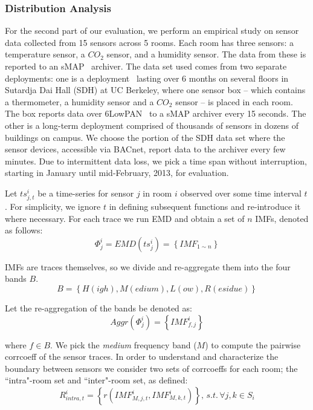 \subsubsection{Distribution Analysis}
For the second part of our evaluation, we perform an empirical study on sensor data collected from 15 sensors across 5 rooms. 
Each room has three sensors: a temperature sensor, a $CO_{2}$ sensor,  and a humidity sensor. 
The data from these is reported to an  
sMAP~\cite{smap} archiver. The data set used comes from two separate deployments: one is a deployment~\cite{Jay} lasting 
over 6 months on several floors in Sutardja Dai Hall (SDH) at UC Berkeley, where one sensor box -- which contains a thermometer, a humidity sensor
 and a $CO_{2}$ sensor -- is placed in each room. The box reports data over 6LowPAN~\cite{6lowpan} to a sMAP archiver every 
 15 seconds. The other is a long-term deployment comprised of thousands of sensors in dozens of buildings on campus. 
 We choose the portion of the SDH data set where the sensor devices, accessible via BACnet, report data to the archiver every few minutes. 
 Due to intermittent data loss, we pick a time span without interruption, starting in January until mid-February, 2013, for evaluation.

Let $ts^{i}_{j,t}$ be a time-series for sensor $j$ in room $i$ observed over some time interval $t$.  For simplicity, we ignore
$t$ in defining subsequent functions and re-introduce it where necessary.
For each trace we run EMD and obtain a set of $n$ IMFs, denoted as follows:
\begin{displaymath}
\Phi^i_j = EMD(ts^i_j) = \left \{ IMF_{1\sim n} \right \}
\end{displaymath}

IMFs are traces themselves, so we divide and re-aggregate them into the four bands $B$.
\begin{displaymath}
B = \left \{ H(igh), M(edium), L(ow), R(esidue) \right \}
\end{displaymath} 

Let the re-aggregation of the bands be denoted as:
\begin{displaymath}
Aggr(\Phi^i_j) = \left \{ IMF^i_{f,j} \right \}
\end{displaymath} 

where $f \in B$.  We pick the \emph{medium} frequency band ($M$) to compute the pairwise corrcoeff of the sensor traces. 
In order to understand and characterize the boundary between sensors we consider two sets of corrcoeffs for each room; the ``intra"-room set and 
``inter"-room set, as defined:
\begin{displaymath}
R^{i}_{intra,t} = \left \{ r(IMF^{i}_{M,j,t}, IMF^{i}_{M,k,t}) \right \}, \,
s.t.\, \forall j,k \in S_i
\end{displaymath}

